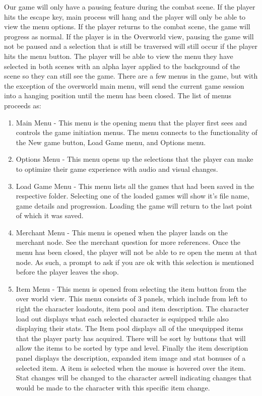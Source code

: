 \documentclass[12pt, titlepage]{article}
\begin{document}
\begin{enumerate}
	Our game will only have a pausing feature during the combat scene. If the player hits the escape key, main process will hang and the player will only be able to view the menu options. If the player returns to the combat scene, the game will progress as normal. If the player is in the Overworld view, pausing the game will not be paused and a selection that is still be traversed will still occur if the player hits the menu button. The player will be able to view the menu they have selected in both scenes with an alpha layer applied to the background of the scene so they can still see the game. 
	There are a few menus in the game, but with the exception of the overworld main menu, will send the current game session into a hanging position until the menu has been closed. The list of menus proceeds as:
	\begin{enumerate}
	\item Main Menu - This menu is the opening menu that the player first sees and controls the game initiation menus. The menu connects to the functionality of  the New game button, Load Game menu, and Options menu.
	\item Options Menu - This menu opens up the selections that the player can make to optimize their game experience with audio and visual changes.
	\item Load Game Menu - This menu lists all the games that had been saved in the respective folder. Selecting one of the loaded games will show it's file name, game details and progression. Loading the game will return to the last point of which it was saved.
	\item Merchant Menu - This menu is opened when the player lands on the merchant node. See the merchant question for more references. Once the menu has been closed, the player will not be able to re open the menu at that node. As such, a prompt to ask if you are ok with this selection is mentioned before the player leaves the shop. %
	\item Item Menu - This menu is opened from selecting the item button from the over world view. This menu consists of 3 panels, which include from left to right the character loadouts, item pool and item description. The character load out displays what each selected character is equipped while also displaying their stats. The Item pool displays all of the unequipped items that the player party has acquired. There will be sort by buttons that will allow the items to be sorted by type and level. Finally the item description panel displays the description, expanded item image and stat bonuses of a selected item. A item is selected when the mouse is hovered over the item. Stat changes will be changed to the character aswell indicating changes that would be made to the character with this specific item change. 

\end{enumerate}
\end{enumerate}
\end{document}
